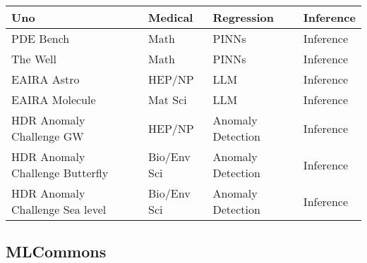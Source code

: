 \begin{table*}[htbp]
{\begin{tabular}{|ll|l||l|l|}
\hline
Uno & & Medical & Regression & Inference \\
\hline
PDE Bench & & Math & PINNs & Inference \\
\hline
The Well & & Math & PINNs & Inference \\
\hline
EAIRA Astro & & HEP/NP & LLM & Inference \\
\hline
EAIRA Molecule & & Mat Sci & LLM & Inference \\
\hline
HDR Anomaly Challenge GW & & HEP/NP & Anomaly Detection & Inference \\
\hline
HDR Anomaly Challenge Butterfly & & Bio/Env Sci & Anomaly Detection & Inference \\
\hline
HDR Anomaly Challenge Sea level & & Bio/Env Sci & Anomaly Detection & Inference \\
\hline
\end{tabular}
}
\end{table*}

\subsection{MLCommons}
\label{subsec:benchmarks-mlcommons}



